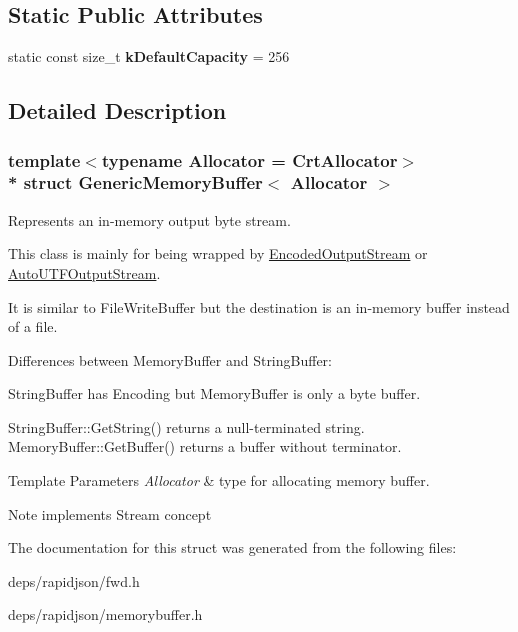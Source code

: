 \subsection*{Static Public Attributes}
\begin{DoxyCompactItemize}
\item 
static const size\+\_\+t {\bfseries k\+Default\+Capacity} = 256\hypertarget{struct_generic_memory_buffer_a5a89d73f383d75be07291190428970b1}{}\label{struct_generic_memory_buffer_a5a89d73f383d75be07291190428970b1}

\end{DoxyCompactItemize}


\subsection{Detailed Description}
\subsubsection*{template$<$typename Allocator = Crt\+Allocator$>$\\*
struct Generic\+Memory\+Buffer$<$ Allocator $>$}

Represents an in-\/memory output byte stream. 

This class is mainly for being wrapped by \hyperlink{class_encoded_output_stream}{Encoded\+Output\+Stream} or \hyperlink{class_auto_u_t_f_output_stream}{Auto\+U\+T\+F\+Output\+Stream}.

It is similar to File\+Write\+Buffer but the destination is an in-\/memory buffer instead of a file.

Differences between Memory\+Buffer and String\+Buffer\+:
\begin{DoxyEnumerate}
\item String\+Buffer has Encoding but Memory\+Buffer is only a byte buffer.
\item String\+Buffer\+::\+Get\+String() returns a null-\/terminated string. Memory\+Buffer\+::\+Get\+Buffer() returns a buffer without terminator.
\end{DoxyEnumerate}


\begin{DoxyTemplParams}{Template Parameters}
{\em Allocator} & type for allocating memory buffer. \\
\hline
\end{DoxyTemplParams}
\begin{DoxyNote}{Note}
implements Stream concept 
\end{DoxyNote}


The documentation for this struct was generated from the following files\+:\begin{DoxyCompactItemize}
\item 
deps/rapidjson/fwd.\+h\item 
deps/rapidjson/memorybuffer.\+h\end{DoxyCompactItemize}
